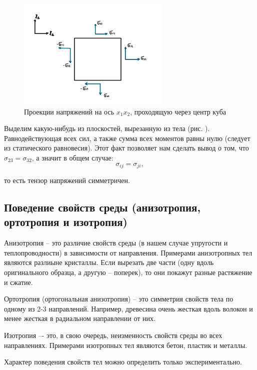\documentclass[12pt,a4paper]{article}
\begin{document}
    \begin{figure}[h]
      \centering
      \includegraphics[width=0.65\textwidth]{cube_cut.jpeg}
      \caption{Проекции напряжений на ось $x_1x_2$, проходящую через центр куба}
      \label{fig:cube_cut}
    \end{figure}

    \pagebreak

    Выделим какую-нибудь из плоскостей, вырезанную из тела (рис. ). Равнодействующая всех сил, а также сумма всех моментов равны нулю (следует из статического равновесия). Этот факт позволяет нам сделать вывод о том, что $\sigma_{23} = \sigma_{32}$, а значит в общем случае:
    \[
      \sigma_{ij} = \sigma_{ji},
    \]

    \noindent то есть тензор напряжений симметричен.

    \subsection{Поведение свойств среды (анизотропия, ортотропия и изотропия)}

    Анизотропия -- это различие свойств среды (в нашем случае упругости и теплопроводности) в зависимости от направления. Примерами анизотропных тел являются разлиыне кристаллы. Если вырезать две части (одну вдоль оригинального образца, а другую -- поперек), то они покажут разные растяжение и сжатие. 

    Ортотропия (ортогональная анизотропия) -- это симметрия свойств тела по одному из 2-3 направлений. Например, древесина очень жесткая вдоль волокон и менее жесткая в радиальном направлении от них.

    Изотропия –- это, в свою очередь, неизменность свойств среды во всех направлениях. Примерами изотропных тел являются бетон, пластик и металлы. 
    
    Характер поведения свойств тел можно определить только экспериментально.
\end{document}
